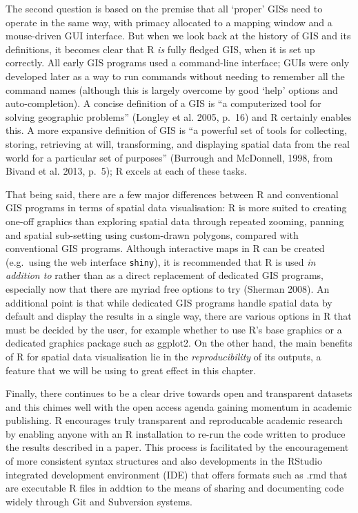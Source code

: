 \documentclass[]{article}
\begin{document}
The second question is based on the premise that all `proper' GISs need
to operate in the same way, with primacy allocated to a mapping window
and a mouse-driven GUI interface. But when we look back at the history
of GIS and its definitions, it becomes clear that R \emph{is} fully
fledged GIS, when it is set up correctly. All early GIS programs used a
command-line interface; GUIs were only developed later as a way to run
commands without needing to remember all the command names (although
this is largely overcome by good `help' options and auto-completion). A
concise definition of a GIS is ``a computerized tool for solving
geographic problems'' (Longley et al. 2005, p.~16) and R certainly
enables this. A more expansive definition of GIS is ``a powerful set of
tools for collecting, storing, retrieving at will, transforming, and
displaying spatial data from the real world for a particular set of
purposes'' (Burrough and McDonnell, 1998, from Bivand et al. 2013,
p.~5); R excels at each of these tasks.

That being said, there are a few major differences between R and
conventional GIS programs in terms of spatial data visualisation: R is
more suited to creating one-off graphics than exploring spatial data
through repeated zooming, panning and spatial sub-setting using
custom-drawn polygons, compared with conventional GIS programs. Although
interactive maps in R can be created (e.g.~using the web interface
\texttt{shiny}), it is recommended that R is used \emph{in addition to}
rather than as a direct replacement of dedicated GIS programs,
especially now that there are myriad free options to try (Sherman 2008).
An additional point is that while dedicated GIS programs handle spatial
data by default and display the results in a single way, there are
various options in R that must be decided by the user, for example
whether to use R's base graphics or a dedicated graphics package such as
ggplot2. On the other hand, the main benefits of R for spatial data
visualisation lie in the \emph{reproducibility} of its outputs, a
feature that we will be using to great effect in this chapter.

Finally, there continues to be a clear drive towards open and
transparent datasets and this chimes well with the open access agenda
gaining momentum in academic publishing. R encourages truly transparent
and reproducable academic research by enabling anyone with an R
installation to re-run the code written to produce the results described
in a paper. This process is facilitated by the encouragement of more
consistent syntax structures and also developments in the RStudio
integrated development environment (IDE) that offers formats such as
.rmd that are executable R files in addtion to the means of sharing and
documenting code widely through Git and Subversion systems.
\end{document}
